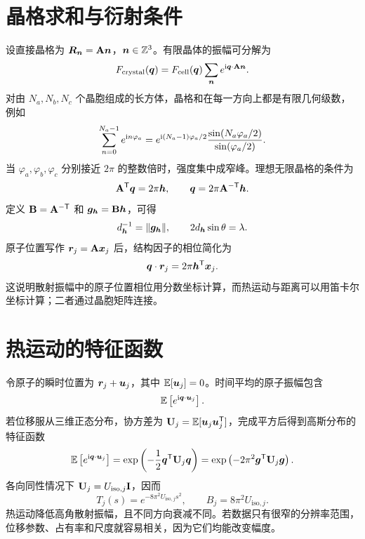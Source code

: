 \section{晶格求和与衍射条件}
设直接晶格为 $\bm{R}_{\bm{n}}=\mathbf{A}\bm{n}$，$\bm{n}\in\mathbb Z^3$。有限晶体的振幅可分解为
\begin{equation}
F_{\mathrm{crystal}}(\bm{q})
=F_{\mathrm{cell}}(\bm{q})\sum_{\bm{n}}e^{\mathrm{i}\bm{q}\cdot\mathbf{A}\bm{n}}.
\end{equation}
对由 $N_a,N_b,N_c$ 个晶胞组成的长方体，晶格和在每一方向上都是有限几何级数，例如
\begin{equation}
\sum_{n=0}^{N_a-1}e^{\mathrm{i} n\varphi_a}
=e^{\mathrm{i}(N_a-1)\varphi_a/2}
\frac{\sin(N_a\varphi_a/2)}{\sin(\varphi_a/2)}.
\end{equation}
当 $\varphi_a,\varphi_b,\varphi_c$ 分别接近 $2\pi$ 的整数倍时，强度集中成窄峰。理想无限晶格的条件为
\begin{equation}
\mathbf{A}^{\mathsf T}\bm{q}=2\pi\bm{h},
\qquad \bm{q}=2\pi\mathbf{A}^{-\mathsf T}\bm{h}.
\end{equation}
定义 $\mathbf{B}=\mathbf{A}^{-\mathsf T}$ 和 $\bm{g}_{\bm{h}}=\mathbf{B}\bm{h}$，可得
\begin{equation}
d_{\bm{h}}^{-1}=\lVert\bm{g}_{\bm{h}}\rVert,
\qquad 2d_{\bm{h}}\sin\theta=\lambda.
\end{equation}
原子位置写作 $\bm{r}_j=\mathbf{A}\bm{x}_j$ 后，结构因子的相位简化为
\begin{equation}
\bm{q}\cdot\bm{r}_j=2\pi\bm{h}^{\mathsf T}\bm{x}_j.
\end{equation}
这说明散射振幅中的原子位置相位用分数坐标计算，而热运动与距离可以用笛卡尔坐标计算；二者通过晶胞矩阵连接。

\section{热运动的特征函数}
令原子的瞬时位置为 $\bm{r}_j+\bm{u}_j$，其中 $\mathbb{E}[\bm{u}_j]=0$。时间平均的原子振幅包含
\begin{equation}
\mathbb{E}\left[e^{\mathrm{i}\bm{q}\cdot\bm{u}_j}\right].
\end{equation}
若位移服从三维正态分布，协方差为 $\mathbf{U}_j=\mathbb{E}[\bm{u}_j\bm{u}_j^{\mathsf T}]$，完成平方后得到高斯分布的特征函数
\begin{equation}
\mathbb{E}\left[e^{\mathrm{i}\bm{q}\cdot\bm{u}_j}\right]
=\exp\left(-\frac12\bm{q}^{\mathsf T}\mathbf{U}_j\bm{q}\right)
=\exp\left(-2\pi^2\bm{g}^{\mathsf T}\mathbf{U}_j\bm{g}\right).
\label{eq:dw}
\end{equation}
各向同性情况下 $\mathbf{U}_j=U_{\mathrm{iso},j}\mathbf{I}$，因而
\begin{equation}
T_j(s)=e^{-8\pi^2U_{\mathrm{iso},j}s^2},\qquad
B_j=8\pi^2U_{\mathrm{iso},j}.
\end{equation}
热运动降低高角散射振幅，且不同方向衰减不同。若数据只有很窄的分辨率范围，位移参数、占有率和尺度就容易相关，因为它们均能改变幅度。

